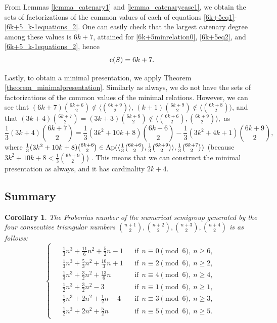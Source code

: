 \documentclass[12pt]{article}
\newtheorem{cor}[thm]{Corollary}
\theoremstyle{remark}
\begin{document}
From Lemmas \ref{lemma_catenary1} and \ref{lemma_catenarycase1}, we obtain the sets of factorizations of the common values of each of equations \eqref{6k+5eq1}-\eqref{6k+5_k-1equations_2}.
One can easily check that the largest catenary degree among these values is $6k+7$, attained for \eqref{6k+5minrelation0}, \eqref{6k+5eq2}, and \eqref{6k+5_k-1equations_2}, hence
$$ \textup{c}(S) = 6k+7.$$

Lastly, to obtain a minimal presentation, we apply Theorem \ref{theorem_minimalpresentation}. Similarly as always, we do not have the sets of factorizations of the common values of the minimal relations. However, we can see that $(6k+7)\binom{6k+6}{2} \notin \langle \binom{6k+9}{2} \rangle$, $(k+1)\binom{6k+9}{2} \notin \langle \binom{6k+8}{2} \rangle$, and that 
$ (3k+4)\binom{6k+7}{2} = (3k+3) \binom{6k+8}{2} \notin \langle \binom{6k+6}{2}, \binom{6k+9}{2} \rangle, $
as 
$$\frac{1}{3}(3k+4)\binom{6k+7}{2} = \frac{1}{3}(3k^2 + 10k + 8)\binom{6k+6}{2} - \frac{1}{3}(3k^2 + 4k +1)\binom{6k+9}{2},$$ where $\frac{1}{3}(3k^2 + 10k + 8)\binom{6k+6}{2} \in \textup{Ap}(\langle \frac{1}{3}\binom{6k+6}{2}, \frac{1}{3}\binom{6k+9}{2} \rangle,\frac{1}{3}\binom{6k+7}{2})$ (because $3k^2 + 10k + 8 < \frac{1}{3}\binom{6k+9}{2}$) . This means that we can construct the minimal presentation as always, and it has cardinality $2k+4$.

\subsection{Summary}

\begin{cor}\label{corfrobtriangular}
The Frobenius number of the numerical semigroup generated by the four consecutive triangular numbers $\binom{n+1}{2},\binom{n+2}{2}, \binom{n+3}{2}, \binom{n+4}{2}$ is as follows:
$$
\begin{cases}
\begin{aligned}
&\frac{1}{3} n^3 + \frac{11}{6} n^2 + \frac{5}{2} n - 1
    &&\text{if} \ \ n \equiv 0 \pmod{6},\ n \ge 6,\\
&\frac{1}{3} n^3 + \frac{5}{3} n^2 + \frac{10}{3} n + 1
    &&\text{if} \ \ n \equiv 2 \pmod{6},\ n \ge 2,\\
&\frac{1}{3} n^3 + \frac{3}{2} n^2 + \frac{13}{6} n
    &&\text{if} \ \ n \equiv 4 \pmod{6},\ n \ge 4,\\
&\frac{1}{2} n^3 + \frac{3}{2} n^2 - 3
    &&\text{if} \ \ n \equiv 1 \pmod{6},\ n \ge 1,\\
&\frac{1}{2} n^3 + 2 n^2 + \frac{1}{2} n - 4
    &&\text{if} \ \ n \equiv 3 \pmod{6},\ n \ge 3,\\
&\frac{1}{2} n^3 + 2 n^2 + \frac{5}{2} n
    &&\text{if} \ \ n \equiv 5 \pmod{6},\ n \ge 5.
\end{aligned}
\end{cases}
$$
 
\end{cor}
\end{document}
